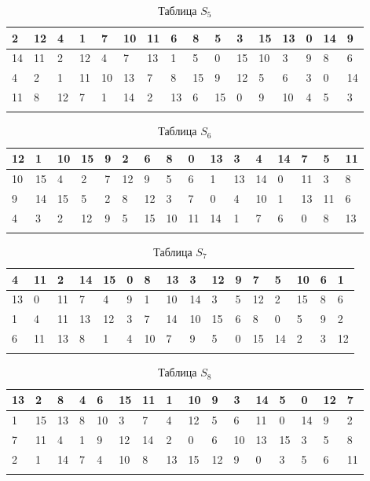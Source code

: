 \documentclass{./civarticle}
\begin{document}
\begin{itemize}
\begin{enumerate}
\begin{longtable}{|p{0.5cm}|p{0.5cm}|p{0.5cm}|p{0.5cm}|p{0.5cm}|p{0.5cm}|p{0.5cm}|p{0.5cm}|p{0.5cm}|p{0.5cm}|p{0.5cm}|p{0.5cm}|p{0.5cm}|p{0.5cm}|p{0.5cm}|p{0.5cm}|}
\hline
2 & 12 & 4 & 1 & 7 & 10 & 11 & 6 & 8 & 5 & 3 & 15 & 13 & 0 & 14 & 9 \\
\hline
14 & 11 & 2 & 12 & 4 & 7 & 13 & 1 & 5 & 0 & 15 & 10 & 3 & 9 & 8 & 6 \\
\hline
4 & 2 & 1 & 11 & 10 & 13 & 7 & 8 & 15 & 9 & 12 & 5 & 6 & 3 & 0 & 14 \\
\hline
11 & 8 & 12 & 7 & 1 & 14 & 2 & 13 & 6 & 15 & 0 & 9 & 10 & 4 & 5 & 3 \\
\hline
\caption{Таблица $S_5$}
\end{longtable}

\begin{longtable}{|p{0.5cm}|p{0.5cm}|p{0.5cm}|p{0.5cm}|p{0.5cm}|p{0.5cm}|p{0.5cm}|p{0.5cm}|p{0.5cm}|p{0.5cm}|p{0.5cm}|p{0.5cm}|p{0.5cm}|p{0.5cm}|p{0.5cm}|p{0.5cm}|}
\hline
12 & 1 & 10 & 15 & 9 & 2 & 6 & 8 & 0 & 13 & 3 & 4 & 14 & 7 & 5 & 11 \\
\hline
10 & 15 & 4 & 2 & 7 & 12 & 9 & 5 & 6 & 1 & 13 & 14 & 0 & 11 & 3 & 8 \\
\hline
9 & 14 & 15 & 5 & 2 & 8 & 12 & 3 & 7 & 0 & 4 & 10 & 1 & 13 & 11 & 6 \\
\hline
4 & 3 & 2 & 12 & 9 & 5 & 15 & 10 & 11 & 14 & 1 & 7 & 6 & 0 & 8 & 13 \\
\hline
\caption{Таблица $S_6$}
\end{longtable}

\begin{longtable}{|p{0.5cm}|p{0.5cm}|p{0.5cm}|p{0.5cm}|p{0.5cm}|p{0.5cm}|p{0.5cm}|p{0.5cm}|p{0.5cm}|p{0.5cm}|p{0.5cm}|p{0.5cm}|p{0.5cm}|p{0.5cm}|p{0.5cm}|p{0.5cm}|}
\hline
4 & 11 & 2 & 14 & 15 & 0 & 8 & 13 & 3 & 12 & 9 & 7 & 5 & 10 & 6 & 1 \\
\hline
13 & 0 & 11 & 7 & 4 & 9 & 1 & 10 & 14 & 3 & 5 & 12 & 2 & 15 & 8 & 6 \\
\hline
1 & 4 & 11 & 13 & 12 & 3 & 7 & 14 & 10 & 15 & 6 & 8 & 0 & 5 & 9 & 2 \\
\hline
6 & 11 & 13 & 8 & 1 & 4 & 10 & 7 & 9 & 5 & 0 & 15 & 14 & 2 & 3 & 12 \\
\hline
\caption{Таблица $S_7$}
\end{longtable}

\begin{longtable}{|p{0.5cm}|p{0.5cm}|p{0.5cm}|p{0.5cm}|p{0.5cm}|p{0.5cm}|p{0.5cm}|p{0.5cm}|p{0.5cm}|p{0.5cm}|p{0.5cm}|p{0.5cm}|p{0.5cm}|p{0.5cm}|p{0.5cm}|p{0.5cm}|}
\hline
13 & 2 & 8 & 4 & 6 & 15 & 11 & 1 & 10 & 9 & 3 & 14 & 5 & 0 & 12 & 7 \\
\hline
1 & 15 & 13 & 8 & 10 & 3 & 7 & 4 & 12 & 5 & 6 & 11 & 0 & 14 & 9 & 2 \\
\hline
7 & 11 & 4 & 1 & 9 & 12 & 14 & 2 & 0 & 6 & 10 & 13 & 15 & 3 & 5 & 8 \\
\hline
2 & 1 & 14 & 7 & 4 & 10 & 8 & 13 & 15 & 12 & 9 & 0 & 3 & 5 & 6 & 11 \\
\hline
\caption{Таблица $S_8$}
\end{longtable}


\end{enumerate}
\end{itemize}
\end{document}
